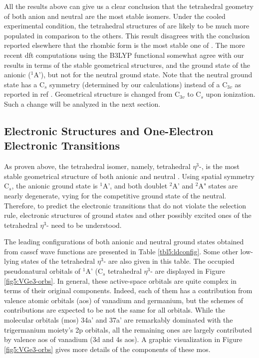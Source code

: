 \begin{refsection}
All the results above can give us a clear conclusion that the tetrahedral geometry of both anion and neutral are the most stable isomers. Under the cooled experimental condition, the tetrahedral structures of  are likely to be much more populated in comparison to the others. This result disagrees with the conclusion reported elsewhere \cite{c5:6} that the rhombic form is the most stable one of . The more recent \acrshort{dft} computations \cite{c5:17} using the B3LYP functional somewhat agree with our results in terms of the stable geometrical structures, and the ground state of the anionic  ($^1$A'), but not for the neutral ground state. Note that the neutral ground state has a C$_s$ symmetry (determined by our calculations) instead of a C$_{3v}$ as reported in ref . Geometrical structure is changed from C$_{3v}$ to C$_s$ upon ionization. Such a change will be analyzed in the next section.





\subsection{Electronic Structures and One-Electron Electronic Transitions}



As proven above, the tetrahedral isomer, namely, tetrahedral $\eta^3$-, is the most stable geometrical structure of both anionic and neutral . Using spatial symmetry C$_s$, the anionic ground state is $^1$A', and both doublet $^2$A' and $^2$A" states are nearly degenerate, vying for the competitive ground state of the neutral. Therefore, to predict the electronic transitions that do not violate the selection rule, electronic structures of ground states and other possibly excited ones of the tetrahedral $\eta^3$- need to be understood.




The leading configurations of both anionic and neutral ground states obtained from \acrshort{casscf} wave functions are presented in Table \ref{tbl5:ldconfig}. Some other low-lying states of the tetrahedral $\eta^3$- are also given in this table. The occupied pseudonatural orbitals of $^1$A' (C$_s$ tetrahedral $\eta^3$- are displayed in Figure \ref{fig5:VGe3-orbs}. In general, these active-space orbitals are quite complex in terms of their original components. Indeed, each of them has a contribution from valence atomic orbitals (\acrshort{ao}s) of vanadium and germanium, but the schemes of contributions are expected to be not the same for all orbitals. While the molecular orbitals (\acrshort{mo}s) 34a' and 37a' are remarkably dominated with the trigermanium moiety's 2p orbitals, all the remaining ones are largely contributed by valence \acrshort{ao}s of vanadium (3d and 4s \acrshort{ao}s). A graphic visualization in Figure \ref{fig5:VGe3-orbs} gives more details of the components of these \acrshort{mo}s.


\end{refsection}
